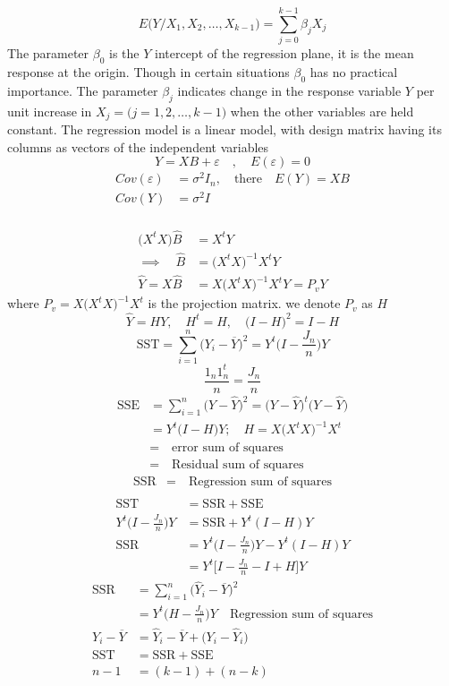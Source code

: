 \documentclass[11pt,a4paper]{article}
\theoremstyle{definition}
\begin{document}
$$E\big(Y/X_1,X_2,\ldots ,X_{k-1}\big) = \sum^{k-1}_{j=0}\beta_jX_j$$
The parameter $\beta_0$ is the $Y$ intercept of the regression plane, it is the mean response at the origin. Though in certain situations $\beta_0$ has no practical importance. The parameter $\beta_j$ indicates change in the response variable $Y$ per unit increase in $X_j=\big(j=1,2,\ldots ,k-1\big)$ when the other variables are held constant. The regression model is a linear model, with design matrix having its columns as vectors of the independent variables
$$Y=XB+\varepsilon\quad  ,\quad  E(\varepsilon)=0$$
\begin{align*}
Cov(\varepsilon) & = \sigma^2I_n,\quad  \text{there}\quad  E(Y)=XB\\
Cov(Y) & = \sigma^2I\\
\end{align*} 


\begin{align*}
\big(X^tX\big)\widehat{B} & = X^tY\\
\implies \quad  \widehat{B} & = \big(X^tX\big)^{-1}X^tY\\
\widehat{Y}= X\widehat{B} & = X\big(X^tX\big)^{-1}X^tY=P_vY
\end{align*}
where $P_v=X\big(X^tX\big)^{-1}X^t$ is the projection matrix. we denote $P_v$ as $H$ $$\widehat{Y}=HY,\quad  H^t=H,\quad  \big(I-H\big)^2=I-H$$
$$\text{SST}=\sum^n_{i=1}\big(Y_i-\overline{Y}\big)^2=Y^t\Big(I-\frac{J_n}{n}\Big)Y$$
$$\frac{1_n1^t_n}{n}=\frac{J_n}{n}$$
\begin{align*}
\text{SSE} & = \sum^n_{i=1}\big(Y-\widehat{Y}\big)^2= \big(Y-\widehat{Y}\big)^t\big(Y-\widehat{Y}\big)\\
           & = Y^t\big(I-H\big)Y;\quad  H=X\big(X^tX\big)^{-1}X^t\\
           & = \quad \text{error sum of squares}\\
           & = \quad  \text{Residual sum of squares}
\end{align*}
\begin{align*}
\text{SSR} & = \quad  \text{Regression sum of squares}\\
\end{align*}
\begin{align*}
\text{SST} & = \text{SSR} + \text{SSE}\\
Y^t\Big(I-\frac{J_n}{n}\Big)Y & = \text{SSR} + Y^t(I-H)Y\\
\text{SSR} & = Y^t\Big(I-\frac{J_n}{n}\Big)Y-Y^t(I-H)Y\\
           & = Y^t\Big[I-\frac{J_n}{n}-I+H\Big]Y
\end{align*}
\begin{align*}
\text{SSR} & = \sum^n_{i=1}\big(\widehat{Y}_i-\overline{Y}\big)^2\\
           & = Y^t\Big(H-\frac{J_n}{n}\Big)Y\quad \text{Regression sum of squares}\\
Y_i-\overline{Y} & = \widehat{Y}_i-\overline{Y} + \big(Y_i-\widehat{Y}_i\big)\\
\text{SST} & = \text{SSR} + \text{SSE}\\
      n-1 & = (k-1) + (n-k)
\end{align*}
\end{document}
